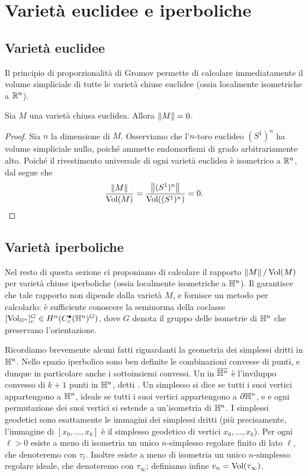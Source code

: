 \section{Varietà euclidee e iperboliche}

\subsection{Varietà euclidee}

Il principio di proporzionalità di Gromov permette di calcolare immediatamente il volume simpliciale di tutte le varietà chiuse euclidee (ossia localmente isometriche a $\mathbb{R}^n$).

\begin{proposition}
Sia $M$ una varietà chiusa euclidea. Allora $\left\lVert M\right\rVert=0$.
\end{proposition}
\begin{proof}
Sia $n$ la dimensione di $M$. Osserviamo che l'$n$-toro euclideo $(S^1)^n$ ha volume simpliciale nullo, poiché ammette endomorfismi di grado arbitrariamente alto. Poiché il rivestimento universale di ogni varietà euclidea è isometrico a $\mathbb{R}^n$, dal  segue che
\[
\frac{\left\lVert M\right\rVert}{\operatorname{Vol}(M)}=\frac{\left\lVert (S^1)^n\right\rVert}{\operatorname{Vol}((S^1)^n)}=0.\qedhere
\]
\end{proof}

\subsection{Varietà iperboliche}
Nel resto di questa sezione ci proponiamo di calcolare il rapporto $\left\lVert M\right\rVert/\operatorname{Vol}(M)$ per varietà chiuse iperboliche (ossia localmente isometriche a $\mathbb{H}^n$). Il  garantisce che tale rapporto non dipende dalla varietà $M$, e fornisce un metodo per calcolarlo: è sufficiente conoscere la seminorma della coclasse $[\operatorname{Vol}_{\mathbb{H}^n}]^G_c\in H^n(C^\bullet_c(\mathbb{H}^n)^G)$, dove $G$ denota il gruppo delle isometrie di $\mathbb{H}^n$ che preservano l'orientazione.

Ricordiamo brevemente alcuni fatti riguardanti la geometria dei simplessi dritti in $\mathbb{H}^n$. Nello spazio iperbolico sono ben definite le combinazioni convesse di punti, e dunque in particolare anche i sottoinsiemi convessi. Un  in $\overline{\mathbb{H}^n}$ è l'inviluppo convesso di $k+1$ punti in $\mathbb{H}^n$, detti . Un simplesso si dice  se tutti i suoi vertici appartengono a $\mathbb{H}^n$, ideale se tutti i suoi vertici appartengono a $\partial\mathbb{H}^n$, e  e ogni permutazione dei suoi vertici si estende a un'isometria di $\mathbb{H}^n$. I simplessi geodetici sono esattamente le immagini dei simplessi dritti (più precisamente, l'immagine di $[x_0,\ldots,x_k]$ è il simplesso geodetico di vertici $x_0,\ldots,x_k$). Per ogni $\ell>0$ esiste a meno di isometria un unico $n$-simplesso regolare finito di lato $\ell$, che denoteremo con $\tau_\ell$. Inoltre esiste a meno di isometria un unico $n$-simplesso regolare ideale, che denoteremo con $\tau_\infty$; definiamo infine $v_n=\operatorname{Vol}(\tau_\infty)$.

